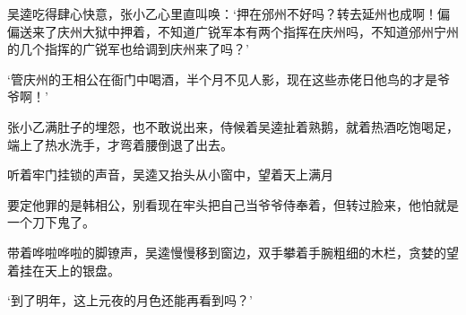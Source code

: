 吴逵吃得肆心快意，张小乙心里直叫唤：‘押在邠州不好吗？转去延州也成啊！偏偏送来了庆州大狱中押着，不知道广锐军本有两个指挥在庆州吗，不知道邠州宁州的几个指挥的广锐军也给调到庆州来了吗？’

‘管庆州的王相公在衙门中喝酒，半个月不见人影，现在这些赤佬日他鸟的才是爷爷啊！’

张小乙满肚子的埋怨，也不敢说出来，侍候着吴逵扯着熟鹅，就着热酒吃饱喝足，端上了热水洗手，才弯着腰倒退了出去。

听着牢门挂锁的声音，吴逵又抬头从小窗中，望着天上满月

要定他罪的是韩相公，别看现在牢头把自己当爷爷侍奉着，但转过脸来，他怕就是一个刀下鬼了。

带着哗啦哗啦的脚镣声，吴逵慢慢移到窗边，双手攀着手腕粗细的木栏，贪婪的望着挂在天上的银盘。

‘到了明年，这上元夜的月色还能再看到吗？’

